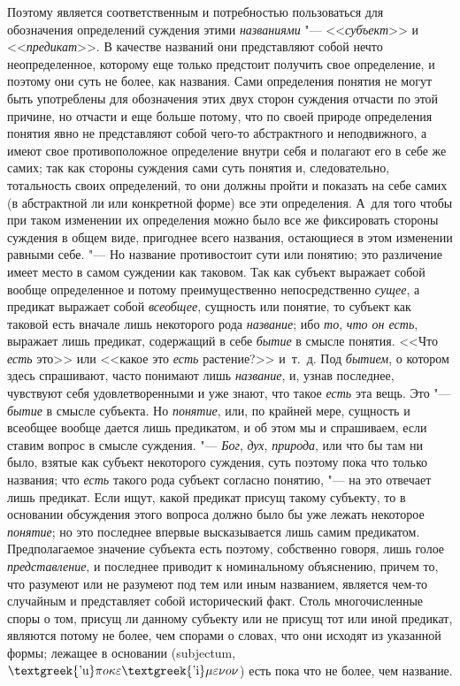 Поэтому является соответственным и потребностью пользоваться
для обозначения определений суждения этими
{\em названиями} "--- <<{\em субъект}>>
и <<{\em предикат}>>.
В качестве названий они представляют собой нечто
неопределенное, которому еще только предстоит получить свое определение, и
поэтому они суть не более, как названия. Сами определения понятия не могут
быть употреблены для обозначения этих двух сторон суждения отчасти по этой
причине, но отчасти и еще больше потому, что по своей природе определения
понятия явно не представляют собой чего-то абстрактного и неподвижного, а
имеют свое противоположное определение внутри себя и полагают его в себе же
самих; так как стороны суждения сами суть понятия и,
следовательно, тотальность своих определений, то они должны пройти и
показать на себе самих (в абстрактной ли или конкретной форме) все эти
определения. А~для того чтобы при таком изменении их определения можно было
все же фиксировать стороны суждения в общем виде, пригоднее всего названия,
остающиеся в этом изменении равными себе. "--- Но название
противостоит сути или понятию; это различение имеет место в самом суждении
как таковом. Так как субъект выражает собой вообще определенное и потому
преимущественно непосредственно
{\em сущее}, а предикат
выражает собой {\em всеобщее},
сущность или понятие, то субъект как таковой есть вначале
лишь некоторого рода {\em название};
ибо {\em то},
{\em что он есть},
выражает лишь предикат, содержащий в себе
{\em бытие} в смысле
понятия. <<Что {\em есть}
это>> или <<какое это
{\em есть} растение?>>
и~т.~д. Под {\em бытием},
о котором здесь спрашивают, часто понимают лишь
{\em название}, и, узнав
последнее, чувствуют себя удовлетворенными и уже знают, что такое
{\em есть} эта вещь. Это
"--- {\em бытие} в смысле
субъекта. Но
{\em понятие},
или, по крайней мере, сущность и всеобщее вообще дается лишь
предикатом, и об этом мы и спрашиваем, если ставим вопрос в смысле
суждения. "--- {\em Бог}, {\em дух}, {\em природа}, или что бы
там ни было, взятые как субъект некоторого суждения, суть поэтому пока что
только названия; что {\em есть}
такого рода субъект согласно понятию, "--- на это
отвечает лишь предикат. Если ищут, какой предикат присущ такому субъекту,
то в основании обсуждения этого вопроса должно было бы уже лежать некоторое
{\em понятие}; но это
последнее впервые высказывается лишь самим предикатом. Предполагаемое
значение субъекта есть поэтому, собственно говоря, лишь голое
{\em представление}, и
последнее приводит к номинальному объяснению, причем то, что разумеют или
не разумеют под тем или иным названием, является чем-то случайным и
представляет собой исторический факт. Столь многочисленные споры о том,
присущ ли данному субъекту или не присущ тот или иной предикат, являются
потому не более, чем спорами о словах, что они исходят из указанной формы;
лежащее в основании (subjectum, $\text{\textgreek{'u}}\pi o\kappa
\varepsilon \text{\textgreek{'i}}\mu \varepsilon \nu o\nu $) есть пока что
не более, чем название.


